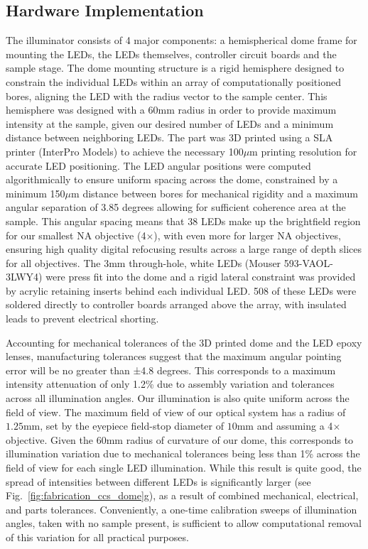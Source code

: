\subsection{Hardware Implementation}
The illuminator consists of 4 major components: a hemispherical dome frame for mounting the LEDs, the LEDs themselves, controller circuit boards and the sample stage. The dome mounting structure is a rigid hemisphere designed to constrain the individual LEDs within an array of computationally positioned bores, aligning the LED with the radius vector to the sample center.  This hemisphere was designed with a $60\textrm{mm}$ radius in order to provide maximum intensity at the sample, given our desired number of LEDs and a minimum distance between neighboring LEDs. The part was 3D printed using a SLA printer (InterPro Models) to achieve the necessary 100$\mu$m printing resolution for accurate LED positioning. The LED angular positions were computed algorithmically to ensure uniform spacing across the dome, constrained by a minimum 150$\mu$m distance between bores for mechanical rigidity and a maximum angular separation of 3.85 degrees allowing for sufficient coherence area at the sample. This angular spacing means that 38 LEDs make up the brightfield region for our smallest NA objective (4$\times$), with even more for larger NA objectives, ensuring high quality digital refocusing results across a large range of depth slices for all objectives. The $3\textrm{mm}$ through-hole, white LEDs (Mouser 593-VAOL-3LWY4) were press fit into the dome and a rigid lateral constraint was provided by acrylic retaining inserts behind each individual LED. 508 of these LEDs were soldered directly to controller boards arranged above the array, with insulated leads to prevent electrical shorting.

Accounting for mechanical tolerances of the 3D printed dome and the LED epoxy lenses, manufacturing tolerances suggest that the maximum angular pointing error will be no greater than ±4.8 degrees. This corresponds to a maximum intensity attenuation of only 1.2\% due to assembly variation and tolerances across all illumination angles. Our illumination is also quite uniform across the field of view. The maximum field of view of our optical system has a radius of $1.25\textrm{mm}$, set by the eyepiece field-stop diameter of $10\textrm{mm}$ and assuming a 4$\times$ objective. Given the $60\textrm{mm}$ radius of curvature of our dome, this corresponds to illumination variation due to mechanical tolerances being less than 1\% across the field of view for each single LED illumination.  While this result is quite good, the spread of intensities between different LEDs is significantly larger (see Fig.~\ref{fig:fabrication_ccs_dome}g), as a result of combined mechanical, electrical, and parts tolerances. Conveniently, a one-time calibration sweeps of illumination angles, taken with no sample present, is sufficient to allow computational removal of this variation for all practical purposes.

